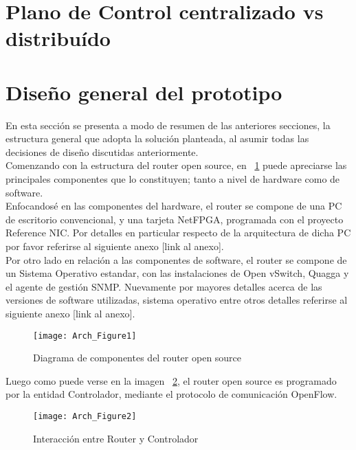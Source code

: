 \section[Alternativas de dise\~nio]{Plano de Control centralizado vs distribu\'ido}

\section[Dise\~no general del prototipo]{Dise\~no general del prototipo}

En esta secci\'on se presenta a modo de resumen de las anteriores secciones, la estructura general que adopta la soluci\'on planteada, al asumir todas las decisiones de dise\~no discutidas anteriormente.\\

Comenzando con la estructura del router open source, en ~\ref{fig:OpenSourceRArch} puede apreciarse las principales componentes que lo constituyen; tanto a nivel de hardware como de software.\\
Enfocandos\'e en las componentes del hardware, el router se compone de una PC de escritorio convencional, y una tarjeta NetFPGA, programada con el proyecto Reference NIC. Por detalles en particular respecto de la arquitectura de dicha PC por favor referirse al siguiente anexo [link al anexo].\\  
Por otro lado en relaci\'on a las componentes de software, el router se compone de un Sistema Operativo estandar, con las instalaciones de Open vSwitch, Quagga y el agente de gesti\'on SNMP. Nuevamente por mayores detalles acerca de las versiones de software utilizadas, sistema operativo entre otros detalles referirse al siguiente anexo [link al anexo].\\

\newpage
\begin{figure}[htbp!] 
\centering    
\texttt{[image: Arch\_Figure1]}
\caption[OpenSourceRArch]{Diagrama de componentes del router open source}
\label{fig:OpenSourceRArch}
\end{figure}

Luego como puede verse en la imagen ~\ref{fig:OpenSourceRArch2}, el router open source es programado por la entidad Controlador, mediante el protocolo de comunicaci\'on OpenFlow.


\begin{figure}[htbp!] 
\centering    
\texttt{[image: Arch\_Figure2]}
\caption[OpenSourceRArch2]{Interacci\'on entre Router y Controlador}
\label{fig:OpenSourceRArch2}
\end{figure}

